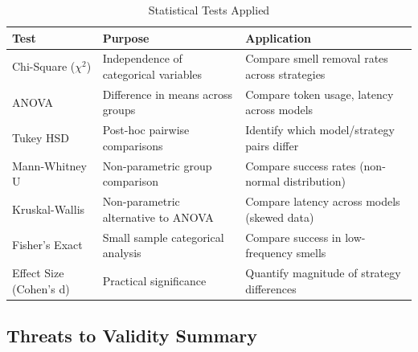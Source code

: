 \begin{table}[h]
\centering
\caption{Statistical Tests Applied}
\label{tab:statistical-tests}
\small
\begin{tabular}{@{}p{3cm}p{4.5cm}p{5cm}@{}}
\toprule
\textbf{Test} & \textbf{Purpose} & \textbf{Application} \\ \midrule
Chi-Square ($\chi^2$) & 
  Independence of categorical variables & 
  Compare smell removal rates across strategies \\
\addlinespace
ANOVA & 
  Difference in means across groups & 
  Compare token usage, latency across models \\
\addlinespace
Tukey HSD & 
  Post-hoc pairwise comparisons & 
  Identify which model/strategy pairs differ \\
\addlinespace
Mann-Whitney U & 
  Non-parametric group comparison & 
  Compare success rates (non-normal distribution) \\
\addlinespace
Kruskal-Wallis & 
  Non-parametric alternative to ANOVA & 
  Compare latency across models (skewed data) \\
\addlinespace
Fisher's Exact & 
  Small sample categorical analysis & 
  Compare success in low-frequency smells \\
\addlinespace
Effect Size (Cohen's d) & 
  Practical significance & 
  Quantify magnitude of strategy differences \\ \bottomrule
\end{tabular}
\end{table}

\subsection{Threats to Validity Summary}

